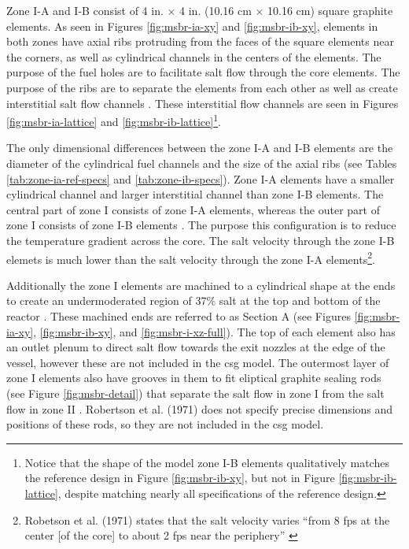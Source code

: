 Zone I-A and I-B consist of 4 in. $\times$ 4 in. (10.16 cm $\times$ 10.16 cm)
square graphite elements. As seen in Figures \ref{fig:msbr-ia-xy} and
\ref{fig:msbr-ib-xy}, elements in both zones have axial ribs protruding from
the faces of the square elements near the corners, as well as cylindrical
channels in the centers of the elements. The purpose of the fuel holes are to
facilitate salt flow through the core elements. The purpose of the ribs are to
separate the elements from each other as well as create interstitial salt flow
channels \cite{robertson_conceptual_1971}. These interstitial flow channels
are seen in Figures \ref{fig:msbr-ia-lattice} and
\ref{fig:msbr-ib-lattice}\footnote{Notice that the shape of the model zone I-B
elements qualitatively matches the reference design in Figure
\ref{fig:msbr-ib-xy}, but  not in Figure \ref{fig:msbr-ib-lattice}, despite
matching nearly all specifications of the reference design.}.

The only dimensional differences between the zone I-A and I-B elements are the
diameter of the cylindrical fuel channels and the size of the axial ribs (see
Tables \ref{tab:zone-ia-ref-specs} and \ref{tab:zone-ib-specs}). Zone I-A
elements have a smaller cylindrical channel and larger interstitial channel
than zone I-B elements. The central part of zone I consists of zone I-A
elements, whereas the outer part of zone I consists of zone I-B
elements \cite{robertson_conceptual_1971}. The purpose this configuration is to
reduce the temperature gradient across the core. The salt velocity through the
zone I-B elemets is much lower than the salt velocity through the zone I-A
elements\footnote{Robetson et al. (1971) states that the salt velocity varies
``from 8 fps at the center [of the core] to about 2 fps near the periphery''
\cite{robertson_conceptual_1971}}.

Additionally the zone I elements are machined to a cylindrical shape at the ends
to create an undermoderated region of 37\% salt at the top and bottom of the
reactor \cite{robertson_conceptual_1971}. These machined ends are referred to as
Section A (see Figures \ref{fig:msbr-ia-xy}, \ref{fig:msbr-ib-xy}, and
\ref{fig:msbr-i-xz-full}). The top of each element also has an outlet plenum to
direct salt flow towards the exit nozzles at the edge of the vessel, however
these are not included in the \Gls{csg} model. The outermost layer of zone I
elements also have grooves in them to fit eliptical graphite sealing rods (see
Figure \ref{fig:msbr-detail}) that separate the salt flow in zone I from the
salt flow in zone II \cite{robertson_conceptual_1971}. Robertson et al. (1971)
does not specify precise dimensions and positions of these rods, so they are not
included in the \Gls{csg} model.

